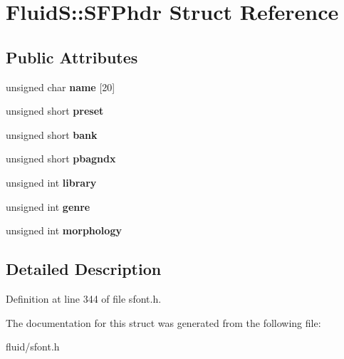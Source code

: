\hypertarget{struct_fluid_s_1_1_s_f_phdr}{}\section{FluidS\+:\+:S\+F\+Phdr Struct Reference}
\label{struct_fluid_s_1_1_s_f_phdr}
\subsection*{Public Attributes}
\begin{DoxyCompactItemize}
\item 
\mbox{\label{struct_fluid_s_1_1_s_f_phdr_a5b9b2bf184b9cdcd4d8fcd038484c6aa}} 
unsigned char {\bfseries name} \mbox{[}20\mbox{]}
\item 
\mbox{\label{struct_fluid_s_1_1_s_f_phdr_aa35ca05ad61bd9be5d0b06f6edf64ad4}} 
unsigned short {\bfseries preset}
\item 
\mbox{\label{struct_fluid_s_1_1_s_f_phdr_ab39795480e7b12bbe65282af285cbf7f}} 
unsigned short {\bfseries bank}
\item 
\mbox{\label{struct_fluid_s_1_1_s_f_phdr_af9f2ad8f5ea9342b91b9738cd93db660}} 
unsigned short {\bfseries pbagndx}
\item 
\mbox{\label{struct_fluid_s_1_1_s_f_phdr_ad362a415ebe62a06f51c59421da8d9c2}} 
unsigned int {\bfseries library}
\item 
\mbox{\label{struct_fluid_s_1_1_s_f_phdr_adf795102aaa3f369417ed93cad1aafb3}} 
unsigned int {\bfseries genre}
\item 
\mbox{\label{struct_fluid_s_1_1_s_f_phdr_a4695ebd9e4582b221134490cdf2ef8d5}} 
unsigned int {\bfseries morphology}
\end{DoxyCompactItemize}


\subsection{Detailed Description}


Definition at line 344 of file sfont.\+h.



The documentation for this struct was generated from the following file\+:\begin{DoxyCompactItemize}
\item 
fluid/sfont.\+h\end{DoxyCompactItemize}

